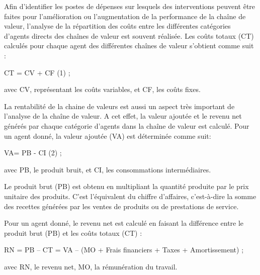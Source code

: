 \documentclass[12pt,oneside]{report}
\begin{document}
Afin d’identifier les postes de dépenses sur lesquels des interventions peuvent être faites pour l’amélioration ou l’augmentation de la performance de la chaîne de valeur, l’analyse de la répartition des coûts entre les différentes catégories d’agents directs des chaînes de valeur est souvent réalisée. Les coûts totaux (CT) calculés pour chaque agent des différentes chaînes de valeur s’obtient comme suit :

CT = CV + CF (1) ;

avec CV, représentant les coûts variables, et CF, les coûts fixes.

La rentabilité de la chaine de valeurs est aussi un aspect très important de l’analyse de la chaîne de valeur. A cet effet, la valeur ajoutée et le revenu net générés par chaque catégorie d’agents dans la chaîne de valeur est calculé. Pour un agent donné, la valeur ajoutée (VA) est déterminée comme suit:

VA= PB - CI (2) ;

avec PB, le produit bruit, et CI, les consommations intermédiaires.

Le produit brut (PB) est obtenu en multipliant la quantité produite par le prix unitaire des produits. C’est l’équivalent du chiffre d’affaires, c’est-à-dire la somme des recettes générées par les ventes de produits ou de prestations de service.

Pour un agent donné, le revenu net est calculé en faisant la différence entre le produit brut (PB) et les coûts totaux (CT) :

RN = PB – CT = VA – (MO + Frais financiers + Taxes + Amortissement) ;

avec RN, le revenu net, MO, la rémunération du travail.
\end{document}
